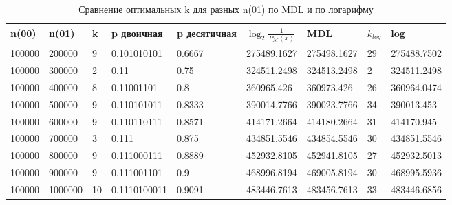 \documentclass[12pt]{article}
\begin{document}
	\begin{table}[!h]
		\caption{Сравнение оптимальных k для разных n(01) по MDL и по логарифму}
		\label{table:comparison}
		\begin{center}
			\begin{tabular}{|l|l|l|l|l|l|l|l|l|}
				\hline
				n(00) & n(01) & k & p двоичная & p десятичная & $\log_2{\frac{1}{P_{\mathcal{M}}(x)}}$ & MDL & $k_{log}$ & log  \\
				\hline 
				100000 & 200000 & 9 & 0.101010101 & 0.6667 & 275489.1627 & 275498.1627 & 29 & 275488.7502 \\ 
				\hline 
				100000 & 300000 & 2 & 0.11 & 0.75 & 324511.2498 & 324513.2498 & 2 & 324511.2498 \\ 
				\hline 
				100000 & 400000 & 8 & 0.11001101 & 0.8 & 360965.426 & 360973.426 & 26 & 360964.0474 \\ 
				\hline 
				100000 & 500000 & 9 & 0.110101011 & 0.8333 & 390014.7766 & 390023.7766 & 34 & 390013.453 \\ 
				\hline 
				100000 & 600000 & 9 & 0.110110111 & 0.8571 & 414171.2664 & 414180.2664 & 31 & 414170.945 \\ 
				\hline 
				100000 & 700000 & 3 & 0.111 & 0.875 & 434851.5546 & 434854.5546 & 30 & 434851.5546 \\ 
				\hline 
				100000 & 800000 & 9 & 0.111000111 & 0.8889 & 452932.8105 & 452941.8105 & 27 & 452932.5013 \\ 
				\hline 
				100000 & 900000 & 9 & 0.111001101 & 0.9 & 468996.8194 & 469005.8194 & 30 & 468995.5936 \\ 
				\hline 
				100000 & 1000000 & 10 & 0.1110100011 & 0.9091 & 483446.7613 & 483456.7613 & 33 & 483446.6856 \\ 
				\hline 
			\end{tabular}
		\end{center}
	\end{table}
	
\end{document}
